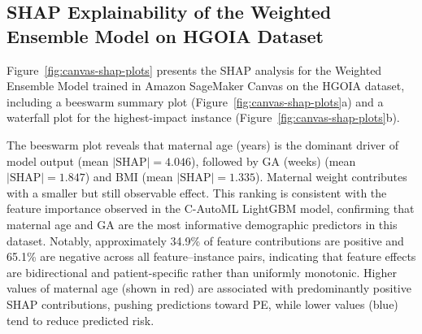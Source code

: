 \documentclass[diagnostics,article,accept,pdftex,moreauthors]{Definitions/mdpi}
\begin{document}
\subsection{SHAP Explainability of the Weighted Ensemble Model on \ac{HGOIA} Dataset}
\label{sec:ensemble-model-xai}

Figure~\ref{fig:canvas-shap-plots} presents the \ac{SHAP} analysis
for the Weighted Ensemble Model trained in Amazon SageMaker
Canvas on the \ac{HGOIA} dataset, including a beeswarm
summary plot (Figure~\ref{fig:canvas-shap-plots}a) and a waterfall plot
for the highest-impact instance (Figure~\ref{fig:canvas-shap-plots}b).

The beeswarm plot reveals that {maternal age} (years) %
is the dominant driver of model output (mean $|\text{SHAP}| = 4.046$),
followed by \ac{GA} {(weeks)} %
(mean $|\text{SHAP}| = 1.847$) {and} \ac{BMI} %
(mean $|\text{SHAP}| = 1.335$).  {Maternal weight} %
contributes with a smaller but still observable effect. This ranking
is consistent with the feature importance observed in the
\ac{C-AutoML} LightGBM model, confirming that {maternal age}
{and}
\ac{GA} are the most informative demographic predictors in
this dataset. Notably, approximately 34.9\% of feature contributions
are positive and 65.1\% are negative across all feature--instance
pairs, indicating that feature effects are bidirectional and
patient-specific rather than uniformly monotonic.  Higher values of
{maternal age} %
(shown in red) are associated with predominantly positive
\ac{SHAP} contributions, pushing predictions toward \ac{PE}, while
lower values (blue) tend to reduce predicted risk.
\end{document}
